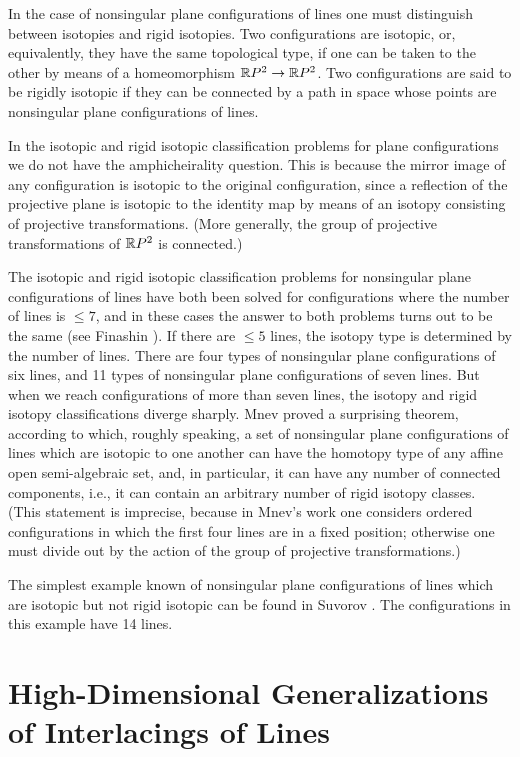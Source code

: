 \documentclass{article}
\begin{document}
In the case of nonsingular plane configurations of lines one must distinguish
between isotopies and rigid isotopies. Two configurations are isotopic, or,
equivalently, they have the same topological type, if one can be taken to the
other by means of a homeomorphism $\mathbb{R} P^2\to\mathbb{R} P^2$. Two configurations
are said to be rigidly isotopic if they can be connected by a path in space
whose points are nonsingular plane configurations of lines.

In the isotopic and rigid isotopic classification problems for plane
configurations we do not have the amphicheirality question. This is 
because the mirror
image of any configuration is isotopic to the original configuration, since a
reflection of the projective plane is isotopic to the identity map by means of
an isotopy consisting of projective transformations. (More generally, the group
of projective transformations of $\mathbb{R} P^2$ is connected.)

The isotopic and rigid isotopic classification problems for nonsingular plane
configurations of lines have both been solved for configurations where the
number of lines is $\le7$, and in these cases the answer to both problems turns
out to be the same (see Finashin \cite{8}). If there are $\le5$ lines, 
the
isotopy type is determined by the number of lines. There are four types of
nonsingular plane configurations of six lines, and 11 types of nonsingular
plane configurations of seven lines. But when we reach configurations of more
than seven lines, the isotopy and rigid isotopy classifications diverge
sharply. Mnev \cite{9} proved a surprising theorem, according to which, 
roughly
speaking, a set of nonsingular plane configurations of lines which are isotopic
to one another can have the homotopy type of any affine open semi-algebraic
set, and, in particular, it can have any number of connected components, i.e.,
it can contain an arbitrary number of rigid isotopy classes. (This statement is
imprecise, because in Mnev's work one considers ordered configurations in which
the first four lines are in a fixed position; otherwise one must divide out by
the action of the group of projective transformations.)

The simplest example known of nonsingular plane configurations of lines which
are isotopic but not rigid isotopic can be found in Suvorov \cite{10}.
The
configurations in this example have 14 lines.


\section{High-Dimensional Generalizations of Interlacings of Lines}
\end{document}
